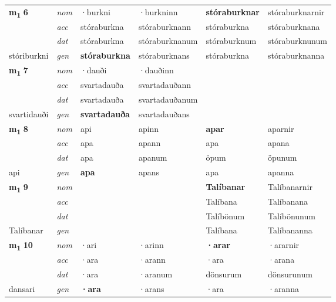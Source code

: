 \begin{longtable}[l]{X>{\footnotesize\itshape}XXXXX}
\multirow{3}{*}{{{\textbf{m{\textsubscript{1}}} \Large{\textbf{6}}}}}  
 & nom & ·burkni & ·burkninn    & \textbf{stóraburknar} & stóraburknarnir  \\*
 & acc & stóraburkna  & stóraburknann   & stóraburkna  & stóraburknana \\*
 & dat & stóraburkna & stóraburknanum   & stóraburknum & stóraburknunum \\*
 {\footnotesize{stóriburkni}} &  gen & \textbf{stóraburkna}  & stóraburknans  & stóraburkna & stóraburknanna \\
\cmidrule{1-6}


\multirow{3}{*}{{{\textbf{m{\textsubscript{1}}} \Large{\textbf{7}}}}}  
 & nom & ·dauði & ·dauðinn    & \textbf{} &   \\*
 & acc & svartadauða  & svartadauðann   &   &  \\*
 & dat & svartadauða & svartadauðanum   &  &  \\*
 {\footnotesize{svartidauði}} &  gen & \textbf{svartadauða}  & svartadauðans  &  &  \\
\cmidrule{1-6}


\multirow{3}{*}{{{\textbf{m{\textsubscript{1}}} \Large{\textbf{8}}}}}  
 & nom & api & apinn    & \textbf{apar} & aparnir  \\*
 & acc & apa  & apann   & apa  & apana \\*
 & dat & apa & apanum   & öpum & öpunum \\*
 {\footnotesize{api}} &  gen & \textbf{apa}  & apans  & apa & apanna \\
\cmidrule{1-6}


\multirow{3}{*}{{{\textbf{m{\textsubscript{1}}} \Large{\textbf{9}}}}}  
 & nom &  &     & \textbf{Talíbanar} & Talíbanarnir  \\*
 & acc &   &    & Talíbana  & Talíbanana \\*
 & dat &  &    & Talíbönum & Talíbönunum \\*
 {\footnotesize{Talíbanar}} &  gen & \textbf{}  &   & Talíbana & Talíbananna \\
\cmidrule{1-6}


\multirow{3}{*}{{{\textbf{m{\textsubscript{1}}} \Large{\textbf{10}}}}}  
 & nom & ·ari & ·arinn    & \textbf{·arar} & ·ararnir  \\*
 & acc & ·ara  & ·arann   & ·ara  & ·arana \\*
 & dat & ·ara & ·aranum   & dönsurum & dönsurunum \\*
 {\footnotesize{dansari}} &  gen & \textbf{·ara}  & ·arans  & ·ara & ·aranna \\
\cmidrule{1-6}



\end{longtable}
